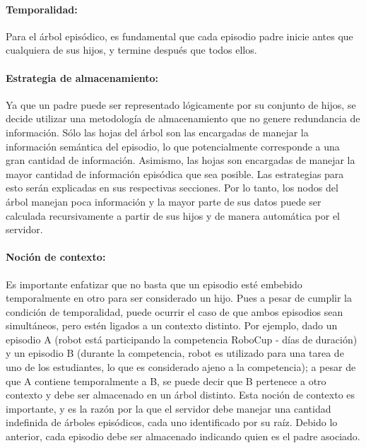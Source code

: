 \paragraph{Temporalidad:}
Para el árbol episódico, es fundamental que cada episodio padre inicie antes que cualquiera de sus hijos, y termine después que todos ellos. 

\paragraph{Estrategia de almacenamiento:}
Ya que un padre puede ser representado lógicamente por su conjunto de hijos, se decide utilizar una metodología de almacenamiento que no genere redundancia de información. Sólo las hojas del árbol son las encargadas de manejar la información semántica del episodio, lo que potencialmente corresponde a una gran cantidad de información. Asimismo, las hojas son encargadas de manejar la mayor cantidad de información episódica que sea posible. Las estrategias para esto serán explicadas en sus respectivas secciones. Por lo tanto, los nodos del árbol manejan poca información y la mayor parte de sus datos puede ser calculada recursivamente a partir de sus hijos y de manera automática por el servidor.

\paragraph{Noción de contexto:}
Es importante enfatizar que no basta que un episodio esté embebido temporalmente en otro para ser considerado un hijo. Pues a pesar de cumplir la condición de temporalidad, puede ocurrir el caso de que ambos episodios sean simultáneos, pero estén ligados a un contexto distinto. Por ejemplo, dado un episodio A (robot está participando la competencia RoboCup - días de duración) y un episodio B (durante la competencia, robot es utilizado para una tarea de uno de los estudiantes, lo que es considerado ajeno a la competencia); a pesar de que A contiene temporalmente a B, se puede decir que B pertenece a otro contexto y debe ser almacenado en un árbol distinto. Esta noción de contexto es importante, y es la razón por la que el servidor debe manejar una cantidad indefinida de árboles episódicos, cada uno identificado por su raíz. Debido lo anterior, cada episodio debe ser almacenado indicando quien es el padre asociado.

